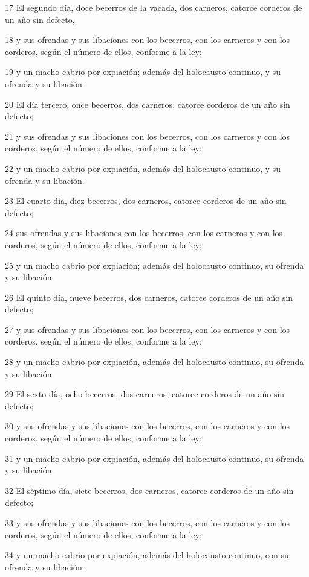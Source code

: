 \par 17 El segundo día, doce becerros de la vacada, dos carneros, catorce corderos de un año sin defecto,
\par 18 y sus ofrendas y sus libaciones con los becerros, con los carneros y con los corderos, según el número de ellos, conforme a la ley;
\par 19 y un macho cabrío por expiación; además del holocausto continuo, y su ofrenda y su libación.
\par 20 El día tercero, once becerros, dos carneros, catorce corderos de un año sin defecto;
\par 21 y sus ofrendas y sus libaciones con los becerros, con los carneros y con los corderos, según el número de ellos, conforme a la ley;
\par 22 y un macho cabrío por expiación, además del holocausto continuo, y su ofrenda y su libación.
\par 23 El cuarto día, diez becerros, dos carneros, catorce corderos de un año sin defecto;
\par 24 sus ofrendas y sus libaciones con los becerros, con los carneros y con los corderos, según el número de ellos, conforme a la ley;
\par 25 y un macho cabrío por expiación; además del holocausto continuo, su ofrenda y su libación.
\par 26 El quinto día, nueve becerros, dos carneros, catorce corderos de un año sin defecto;
\par 27 y sus ofrendas y sus libaciones con los becerros, con los carneros y con los corderos, según el número de ellos, conforme a la ley;
\par 28 y un macho cabrío por expiación, además del holocausto continuo, su ofrenda y su libación.
\par 29 El sexto día, ocho becerros, dos carneros, catorce corderos de un año sin defecto;
\par 30 y sus ofrendas y sus libaciones con los becerros, con los carneros y con los corderos, según el número de ellos, conforme a la ley;
\par 31 y un macho cabrío por expiación, además del holocausto continuo, su ofrenda y su libación.
\par 32 El séptimo día, siete becerros, dos carneros, catorce corderos de un año sin defecto;
\par 33 y sus ofrendas y sus libaciones con los becerros, con los carneros y con los corderos, según el número de ellos, conforme a la ley;
\par 34 y un macho cabrío por expiación, además del holocausto continuo, con su ofrenda y su libación.
